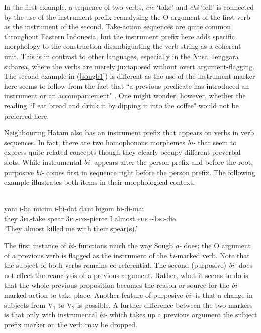 In the first example, a sequence of two verbs, \textit{eic} `take' and \textit{ehi} `fell' is connected by the use of the instrument prefix reanalysing the O argument of the first verb as the instrument of the second. Take-action sequences are quite common throughout Eastern Indonesia, but the instrument prefix here adds specific morphology to the construction disambiguating the verb string as a coherent unit. This is in contrast to other languages, especially in the Nusa Tenggara subarea, where the verbs are merely juxtaposed without overt argument-flagging. The second example in (\ref{sougb1}) is different as the use of the instrument marker here seems to follow from the fact that ``a previous predicate has introduced an instrument or an accompaniement" \citep[205]{reesink2002grammar}. One might wonder, however, whether the reading ``I eat bread and drink it by dipping it into the coffee" would not be preferred here.

Neighbouring Hatam also has an instrument prefix that appears on verbs in verb sequences. In fact, there are two homophonous morphemes \textit{bi-} that seem to express quite related concepts though they clearly occupy different preverbal slots. While instrumental \textit{bi-} appears after the person prefix and before the root, purposive \textit{bi-} comes first in sequence right before the person prefix. The following example illustrates both items in their morphological context.

\ea 
{}\\
\gll yoni i-ba micim i-bi-dat dani bigom bi-di-mai \\
they \textsc{3}\textsc{pl}-take spear \textsc{3}\textsc{pl}-\textsc{ins}-pierce I almost \textsc{purp}-\textsc{1}\textsc{sg}-die \\
\glft `They almost killed me with their spear(s).' 
\z

The first instance of \textit{bi-} functions much the way Sougb \textit{a-} does: the O argument of a previous verb is flagged as the instrument of the \textit{bi-}marked verb. Note that the subject of both verbs remains co-referential. The second (purposive) \textit{bi-} does not effect the reanalysis of a previous argument. Rather, what it seems to do is that the whole previous proposition becomes the reason or source for the \textit{bi-}marked action to take place. Another feature of purposive \textit{bi-} is that a change in subjects from V$_1$ to V$_2$ is possible. A further difference between the two markers is that only with instrumental \textit{bi-} which takes up a previous argument the subject prefix marker on the verb may be dropped.

